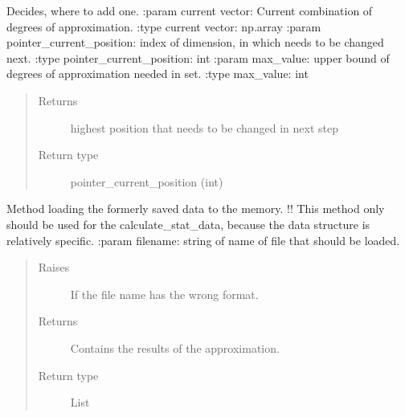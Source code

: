 \documentclass[letterpaper,10pt,english]{sphinxmanual}
\begin{document}
\begin{fulllineitems}
\label{\detokenize{index:Studienprojekt_Smolyak_qmc_one_point.find_right_position}}
Decides, where to add one.
:param current vector: Current combination of degrees of approximation.
:type current vector: np.array
:param pointer\_current\_position: index of dimension, in which needs  to be changed next.
:type pointer\_current\_position: int
:param max\_value: upper bound of degrees of approximation needed in set.
:type max\_value: int
\begin{quote}\begin{description}
\item[{Returns}] \leavevmode
highest position that needs to be changed in next step

\item[{Return type}] \leavevmode
pointer\_current\_position (int)

\end{description}\end{quote}

\end{fulllineitems}


\begin{fulllineitems}
\label{\detokenize{index:Studienprojekt_Smolyak_qmc_one_point.load_stat_data}}
Method loading the formerly saved data to the memory. !! This method only should be used for the
calculate\_stat\_data, because the data structure is relatively specific.
:param filename: string of name of file that should be loaded.
\begin{quote}\begin{description}
\item[{Raises}] \leavevmode
{} \textendash{} If the file name has the wrong format.

\item[{Returns}] \leavevmode
Contains the results of the approximation.

\item[{Return type}] \leavevmode
List

\end{description}\end{quote}

\end{fulllineitems}
\end{document}
